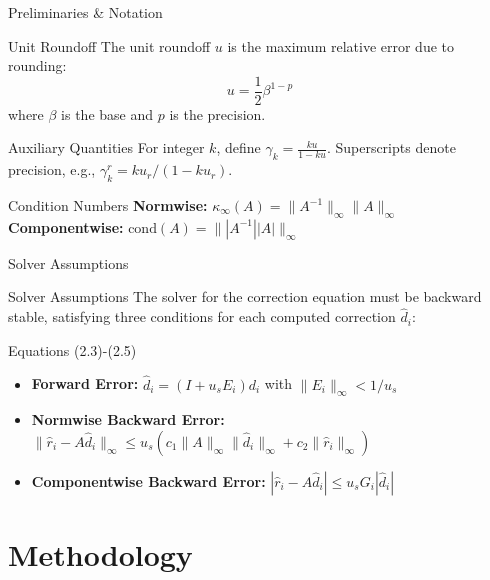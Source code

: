 \documentclass[
	11pt,
	aspectratio=169,
]{beamer}
\begin{document}
\begin{frame}{Preliminaries \& Notation}
\setlength{\itemsep}{0pt}
\begin{block}{Unit Roundoff}
The unit roundoff $u$ is the maximum relative error due to rounding:
\[
u = \frac{1}{2} \beta^{1-p}
\]
where $\beta$ is the base and $p$ is the precision.
\end{block}
\vspace{-0.5em}
\begin{block}{Auxiliary Quantities}
For integer $k$, define $\gamma_k = \frac{k u}{1 - k u}$. Superscripts denote precision, e.g., $\gamma_k^r = k u_r / (1 - k u_r)$.
\end{block}
\vspace{-0.5em}
\begin{block}{Condition Numbers}
\textbf{Normwise:} $\kappa_{\infty}(A) = \| A^{-1} \|_{\infty} \| A \|_{\infty}$ \\
\textbf{Componentwise:} $\text{cond}(A) = \parallel |A^{-1}| |A| \parallel_{\infty}$
\end{block}
\end{frame}
\begin{frame}{Solver Assumptions}
    \begin{alertblock}{Solver Assumptions}
The solver for the correction equation must be backward stable, satisfying three conditions for each computed correction $\widehat{d}_i$:
\end{alertblock}

\begin{block}{Equations (2.3)-(2.5)}
\begin{itemize}
    \item \textbf{Forward Error:} $\widehat{d}_i = (I + u_s E_i) d_i$ with $\|E_i\|_\infty < 1/u_s$
    \item \textbf{Normwise Backward Error:} $\| \widehat{r}_i - A\widehat{d}_i \|_\infty \leq u_s ( c_1 \|A\|_\infty \|\widehat{d}_i\|_\infty + c_2 \|\widehat{r}_i\|_\infty )$
    \item \textbf{Componentwise Backward Error:} $| \widehat{r}_i - A\widehat{d}_i | \leq u_s G_i | \widehat{d}_i |$
\end{itemize}
\end{block}
\end{frame}


\section{Methodology}
\end{document}
